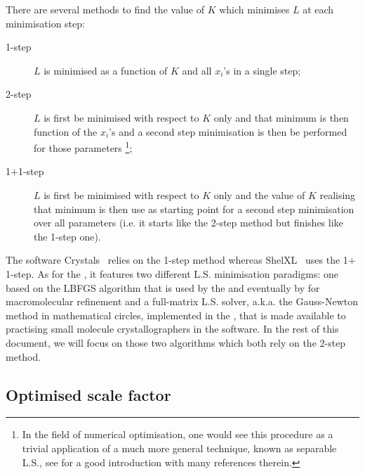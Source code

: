 \documentclass[11pt]{article}
\begin{document}
There are several methods to find the value of $K$ which minimises $L$ at each minimisation step:
\begin{description}
\item[1-step] $L$ is minimised as a function of $K$ and all $x_i$'s in a single step;
\label{eqn:onestepmini}
\item[2-step] $L$ is first be minimised with respect to $K$ only and that minimum is then function of the $x_i$'s and a second step minimisation is then be performed for those parameters \footnote{In the field of numerical optimisation, one would see this procedure as a trivial application of a much more general technique, known as separable L.S., see \cite{Nielsen:2000fr} for a good introduction with many references therein.};
\item[1$+$1-step] $L$ is first be minimised with respect to $K$ only and the value of $K$ realising that minimum is then use as starting point for a second step minimisation over all parameters (i.e. it starts like the 2-step method but finishes like the 1-step one).
\label{eqn:twostepmini}
\end{description}
The software Crystals~\cite{Crystals:v12} relies on the 1-step method whereas ShelXL~\cite{SHELX:man97} uses the 1$+$1-step. As for the , it features two different L.S. minimisation paradigms: one based on the LBFGS algorithm \cite{Nocedal:1980} that is used by the  and eventually by  \cite{phenix} for macromolecular refinement and a full-matrix L.S. solver, a.k.a. the Gauss-Newton method in mathematical circles, implemented in the , that is made available to practising small molecule crystallographers in the  software. In the rest of this document, we will focus on those two  algorithms which both rely on the 2-step method.

\subsection{Optimised scale factor}
\end{document}
